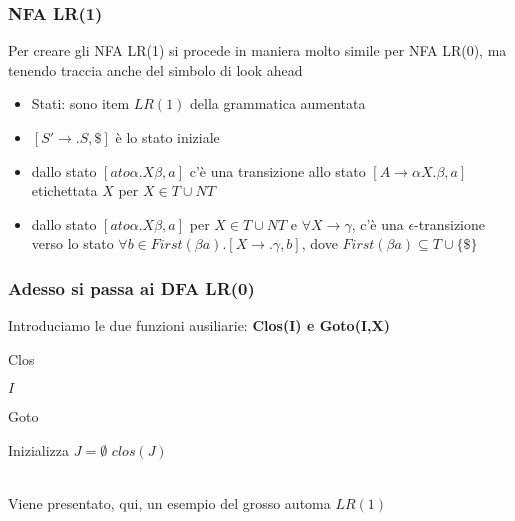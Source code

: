 \subsubsection{NFA LR(1)}

Per creare gli NFA LR(1) si procede in maniera molto simile per NFA LR(0), ma tenendo traccia anche del simbolo di look ahead
\begin{itemize}
    \item Stati: sono item $LR(1)$ della grammatica aumentata
    \item $[S'\to.S, \$]$ è lo stato iniziale
    \item dallo stato $[ato\alpha.X\beta,a]$ c'è una transizione allo stato $[A\to \alpha X.\beta,a]$ etichettata $X$ per $X\in T\cup NT$
    \item dallo stato $[ato\alpha.X\beta,a]$ per $X\in T\cup NT$ e $\forall X\to\gamma$, c'è una $\epsilon$-transizione verso lo stato $\forall b\in First(\beta a).[X\to .\gamma, b]$, dove $First(\beta a)\subseteq T\cup\{\$\}$
\end{itemize}

\subsubsection{Adesso si passa ai DFA LR(0)}

Introduciamo le due funzioni ausiliarie: \textbf{Clos(I) e Goto(I,X)}

\begin{algorithm}
    \caption{Clos}

    \Return $I$\;
\end{algorithm}

\begin{algorithm}
    \caption{Goto}

    Inizializza $J=\emptyset$\;
    \Return $clos(J)$\;
\end{algorithm}
\\

Viene presentato, qui, un esempio del grosso automa $LR(1)$

